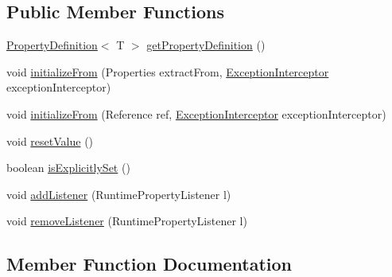 \subsection*{Public Member Functions}
\begin{DoxyCompactItemize}
\item 
\mbox{\hyperlink{interfacecom_1_1mysql_1_1cj_1_1conf_1_1_property_definition}{Property\+Definition}}$<$ T $>$ \mbox{\hyperlink{interfacecom_1_1mysql_1_1cj_1_1conf_1_1_runtime_property_a4bce3de7ed82bff09a896c7192148750}{get\+Property\+Definition}} ()
\item 
void \mbox{\hyperlink{interfacecom_1_1mysql_1_1cj_1_1conf_1_1_runtime_property_a0ab00125bf110114bb1608e51167b4fd}{initialize\+From}} (Properties extract\+From, \mbox{\hyperlink{interfacecom_1_1mysql_1_1cj_1_1exceptions_1_1_exception_interceptor}{Exception\+Interceptor}} exception\+Interceptor)
\item 
void \mbox{\hyperlink{interfacecom_1_1mysql_1_1cj_1_1conf_1_1_runtime_property_a082d6bf96ac4865da37f76b4315a2262}{initialize\+From}} (Reference ref, \mbox{\hyperlink{interfacecom_1_1mysql_1_1cj_1_1exceptions_1_1_exception_interceptor}{Exception\+Interceptor}} exception\+Interceptor)
\item 
void \mbox{\hyperlink{interfacecom_1_1mysql_1_1cj_1_1conf_1_1_runtime_property_adad737e212723fc3f3da903259377a25}{reset\+Value}} ()
\item 
boolean \mbox{\hyperlink{interfacecom_1_1mysql_1_1cj_1_1conf_1_1_runtime_property_aba353b5735f430e108c0f727adea80a1}{is\+Explicitly\+Set}} ()
\item 
void \mbox{\hyperlink{interfacecom_1_1mysql_1_1cj_1_1conf_1_1_runtime_property_ad5d46f87e147c58edfa43d2d9d93967d}{add\+Listener}} (Runtime\+Property\+Listener l)
\item 
void \mbox{\hyperlink{interfacecom_1_1mysql_1_1cj_1_1conf_1_1_runtime_property_a171f2224114d716cb6dfcf1dabcf4092}{remove\+Listener}} (Runtime\+Property\+Listener l)
\end{DoxyCompactItemize}


\subsection{Member Function Documentation}
\mbox{\label{interfacecom_1_1mysql_1_1cj_1_1conf_1_1_runtime_property_ad5d46f87e147c58edfa43d2d9d93967d}} 
